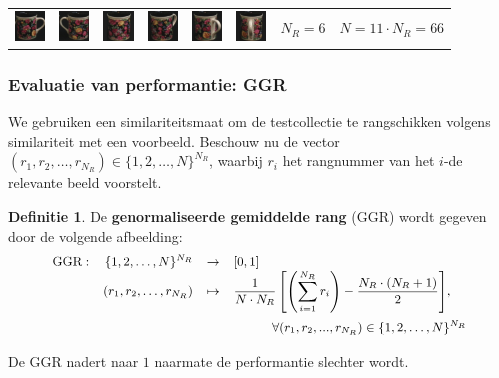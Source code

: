 \documentclass[dutch]{beamer}
\theoremstyle{definition}
\newtheorem{definitie}[theorem]{Definitie}
\theoremstyle{remark}
\theoremstyle{example}
\begin{document}
{\begin{center}
\begin{tabular}{c@{\ }c@{}c@{}c@{}c@{}c c@{\ }c@{}c@{}c@{}c@{}c}
\includegraphics[width=0.8cm]{coil/beeld-60.eps} &
\includegraphics[width=0.8cm]{coil/beeld-61.eps} &
\includegraphics[width=0.8cm]{coil/beeld-62.eps} &
\includegraphics[width=0.8cm]{coil/beeld-63.eps} &
\includegraphics[width=0.8cm]{coil/beeld-64.eps} &
\includegraphics[width=0.8cm]{coil/beeld-65.eps} &
\multicolumn{2}{c}{$N_R = 6$} & 
\multicolumn{4}{c}{$N = 11 \cdot N_R = 66$}

\end{tabular}
\end{center}

}
\frame
{
  \frametitle{Evaluatie van performantie: GGR}

  We gebruiken een similariteitsmaat om de testcollectie te rangschikken volgens
  similariteit met een voorbeeld. Beschouw nu de vector 
  $(r_1,r_2,\ldots,r_{N_R}) \in \{1,2,\ldots,N\}^{N_R}$, 
  waarbij $r_i$ het rangnummer van het $i$-de relevante beeld voorstelt.

  \begin{definitie}
  
  De \textbf{genormaliseerde gemiddelde rang} (GGR) wordt gegeven door de volgende afbeelding:
  $$
  \small\begin{array}{lrcl}
  \textrm{GGR}: & \{1,2,\ldots,N\}^{N_R} & \to 	& [0,1] \\
		& (r_1,r_2,\ldots,r_{N_R}) & \mapsto &
	{\displaystyle\frac{1}{N \cdot N_R}\left[ \left(\sum_{i=1}^{N_R}r_i\right) - \frac{N_R \cdot (N_R + 1)}{2} \right]},\\[15pt]
	& & & \qquad \quad \forall (r_1, r_2, ..., r_{N_R}) \in \{1,2,\ldots,N\}^{N_R}
  \end{array}
  $$
  \end{definitie}
 
  De GGR nadert naar $1$ naarmate de performantie slechter wordt.
}
\end{document}
